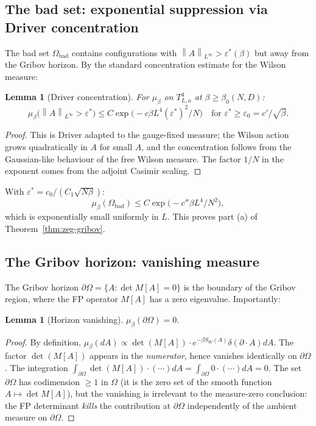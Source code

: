 \documentclass[11pt,a4paper]{amsart}
\newtheorem{lemma}[theorem]{Lemma}
\theoremstyle{definition}
\newcommand{\norm}[1]{\left\lVert#1\right\rVert}
\begin{document}
\subsection{The bad set: exponential suppression via Driver concentration}

The bad set $\Omega_{\mathrm{bad}}$ contains configurations with
$\norm{A}_{L^\infty} > \varepsilon^*(\beta)$ but away from the Gribov horizon.
By the standard concentration estimate for the Wilson measure:

\begin{lemma}[Driver concentration]\label{lem:driver}
For $\mu_\beta$ on $T^4_{L,a}$ at $\beta \geq \beta_0(N, D)$:
\[
\mu_\beta\bigl(\norm{A}_{L^\infty} > \varepsilon^*\bigr)
\leq C \exp\bigl(-c \beta L^4 (\varepsilon^*)^2 / N\bigr)
\quad \text{for } \varepsilon^* \geq \varepsilon_0 = c'/\sqrt{\beta}.
\]
\end{lemma}

\begin{proof}
This is Driver \cite[Lemma~3.2]{Driver1989} adapted to the gauge-fixed
measure; the Wilson action grows quadratically in $A$ for small $A$,
and the concentration follows from the Gaussian-like behaviour of the
free Wilson measure. The factor $1/N$ in the exponent comes from the
adjoint Casimir scaling.
\end{proof}

With $\varepsilon^* = c_0/(C_1 \sqrt{N\beta})$:
\[
\mu_\beta(\Omega_{\mathrm{bad}}) \leq C \exp\bigl(-c'' \beta L^4 / N^2\bigr),
\]
which is exponentially small uniformly in $L$. This proves part (a)
of Theorem~\ref{thm:zeg-gribov}.

\subsection{The Gribov horizon: vanishing measure}

The Gribov horizon $\partial \Omega = \{A : \det M[A] = 0\}$ is the
boundary of the Gribov region, where the FP operator $M[A]$ has a
zero eigenvalue. Importantly:

\begin{lemma}[Horizon vanishing]\label{lem:horizon}
$\mu_\beta(\partial\Omega) = 0$.
\end{lemma}

\begin{proof}
By definition,
$\mu_\beta(dA) \propto \det(M[A]) \cdot e^{-\beta S_W(A)} \delta(\partial \cdot A) dA$.
The factor $\det(M[A])$ appears in the \emph{numerator}, hence vanishes
identically on $\partial \Omega$. The integration
$\int_{\partial \Omega} \det(M[A]) \cdot (\cdots) dA = \int_{\partial \Omega} 0 \cdot (\cdots) dA = 0$.
The set $\partial \Omega$ has codimension $\geq 1$ in $\Omega$ (it is the
zero set of the smooth function $A \mapsto \det M[A]$), but the
vanishing is irrelevant to the measure-zero conclusion: the FP determinant
\emph{kills} the contribution at $\partial \Omega$ independently of the
ambient measure on $\partial \Omega$.
\end{proof}
\end{document}
